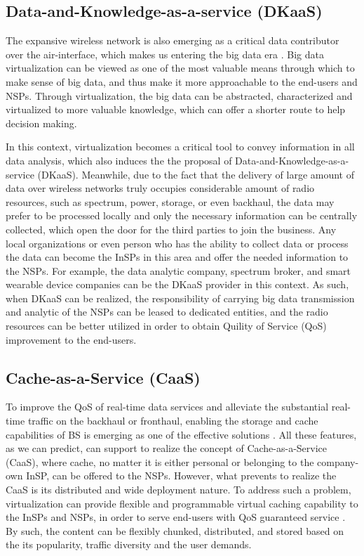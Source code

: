 \documentclass[12pt,draftclsnofoot,onecolumn]{IEEEtran}
\begin{document}
\subsection{Data-and-Knowledge-as-a-service (DKaaS)}

The expansive wireless network is also emerging as a critical data
contributor over the air-interface, which makes us entering the
big data era \cite{Bi}.  Big data virtualization can be viewed as
one of the most valuable means through which to make sense of big
data, and thus make it more approachable to the end-users and
NSPs. Through virtualization, the big data can be abstracted,
characterized and virtualized to more valuable knowledge, which
can offer a shorter route to help decision making. \par

In this context, virtualization becomes a critical tool to convey
information in all data analysis, which also induces the the
proposal of Data-and-Knowledge-as-a-service (DKaaS). Meanwhile,
due to the fact that the delivery of large amount of data over
wireless networks truly occupies considerable amount of radio
resources, such as spectrum, power, storage, or even backhaul, the
data may prefer to be processed locally and only the necessary
information can be centrally collected, which open the
door for the third parties to join the business. Any local
organizations or even person who has the ability to collect data
or process the data can become the InSPs in this area and offer the
needed information to the NSPs. For example, the data analytic
company, spectrum broker, and smart wearable device companies can be the
DKaaS provider in this context. As such,
when DKaaS can be realized, the responsibility of carrying big
data transmission and analytic of the NSPs can be leased to
dedicated entities, and the radio resources can be better utilized
in order to obtain Quility of Service (QoS) improvement to the end-users.

\subsection{Cache-as-a-Service (CaaS)}

To improve the QoS of real-time data services and alleviate the
substantial real-time traffic on the backhaul or fronthaul,
enabling the storage and cache capabilities of BS is emerging as
one of the effective solutions \cite{Zhou}. All these features, as
we can predict, can support to realize the concept of
Cache-as-a-Service (CaaS), where cache, no matter it is either
personal or belonging to the company-own InSP, can be offered to
the NSPs. However, what prevents to realize the CaaS is its
distributed and wide deployment nature. To address such a problem,
virtualization can provide flexible and programmable virtual
caching capability to the InSPs and NSPs, in order to serve
end-users with QoS guaranteed service \cite{Li}. By such, the
content can be flexibly chunked, distributed, and stored based on
the its popularity, traffic diversity and the user demands.
\par
\end{document}

